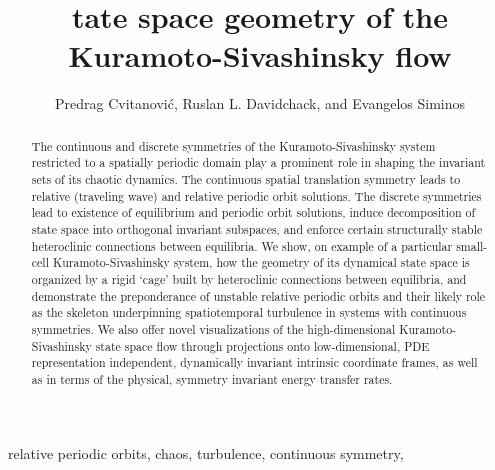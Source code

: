 \documentclass{siamltex}          %
\begin{document}
                \title{
tate space geometry of the
Kuramoto-Sivashinsky flow 
                 }
                  \author{
Predrag Cvitanovi\'c\footnotemark[1],
Ruslan L. Davidchack\footnotemark[2],
    and
Evangelos Siminos\footnotemark[1]
                    }

                \maketitle

\renewcommand{\thefootnote}{\fnsymbol{footnote}}
\renewcommand{\thefootnote}{\arabic{footnote}}

                \begin{abstract}
The continuous and discrete symmetries of the
Kuramoto-Sivashinsky system restricted to a spatially
periodic domain play a prominent role in shaping the
invariant sets of its chaotic dynamics. The continuous
spatial translation symmetry leads to relative 
(traveling wave) and relative periodic orbit
 solutions. The discrete
symmetries lead to existence of {equilibrium} and periodic
orbit solutions, induce decomposition of state space into
orthogonal invariant subspaces, and enforce certain
structurally stable heteroclinic connections between
equilibria. We show, on example of a particular small-cell
Kuramoto-Sivashinsky system, how the geometry of its
dynamical state space is organized by a rigid `cage' built by
heteroclinic connections between equilibria, and demonstrate
the preponderance of unstable relative periodic orbits and
their likely role as the skeleton underpinning spatiotemporal
turbulence in systems with continuous symmetries. We also
offer novel visualizations of the high-dimensional
Kuramoto-Sivashinsky state space flow through projections
onto low-dimensional, PDE representation independent,
dynamically invariant intrinsic coordinate frames, as well as
in terms of the physical, symmetry invariant energy transfer
rates.
                \end{abstract}

\begin{keywords}
relative periodic orbits, chaos, turbulence, continuous symmetry, {\KSe}
\end{keywords}
\end{document}
